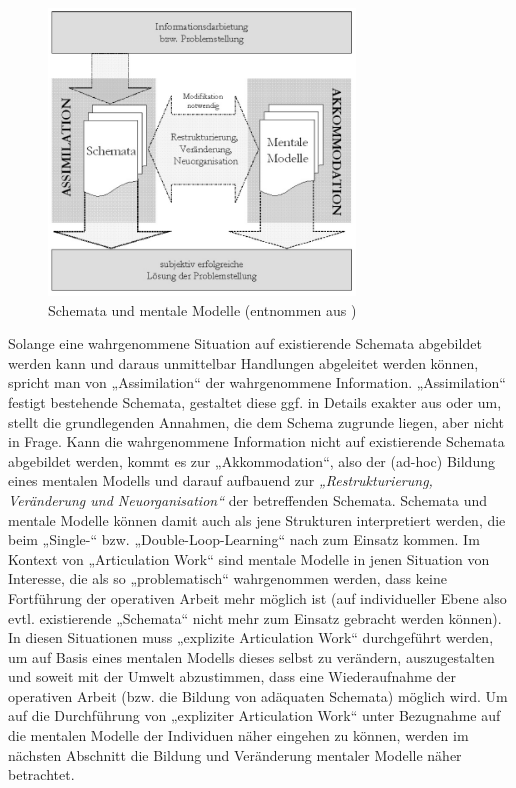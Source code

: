 \begin{figure}[htbp]
	\centering		\includegraphics[height=3in]{img/MentaleModelle/iffenthaler_assimilation_akkommodation.png}
	\caption[Schemata und mentale Modelle]{Schemata und mentale Modelle (entnommen aus \citet[][S. 10]{Ifenthaler06})}
	\label{fig:img_MentaleModelle_iffenthaler_assimilation_akkommodation}
\end{figure}

Solange eine wahrgenommene Situation auf existierende Schemata abgebildet werden kann und daraus unmittelbar Handlungen abgeleitet werden können, spricht man von „Assimilation“ der wahrgenommene Information. „Assimilation“ festigt bestehende Schemata, gestaltet diese ggf. in Details exakter aus oder um, stellt die grundlegenden Annahmen, die dem Schema zugrunde liegen, aber nicht in Frage. Kann die wahrgenommene Information nicht auf existierende Schemata abgebildet werden, kommt es zur „Akkommodation“, also der (ad-hoc) Bildung eines mentalen Modells und darauf aufbauend zur \emph{„Restrukturierung, Veränderung und Neuorganisation“} \citep{Ifenthaler06} der betreffenden Schemata. Schemata und mentale Modelle können damit auch als jene Strukturen interpretiert werden, die beim „Single-“ bzw. „Double-Loop-Learning“ nach \citet{Argyris78} zum Einsatz kommen. Im Kontext von „Articulation Work“ sind mentale Modelle in jenen Situation von Interesse, die als so „problematisch“ wahrgenommen werden, dass keine Fortführung der operativen Arbeit mehr möglich ist (auf individueller Ebene also evtl. existierende „Schemata“ nicht mehr zum Einsatz gebracht werden können). In diesen Situationen muss „explizite Articulation Work“ durchgeführt werden, um auf Basis eines mentalen Modells dieses selbst zu verändern, auszugestalten und soweit mit der Umwelt abzustimmen, dass eine Wiederaufnahme der operativen Arbeit (bzw. die Bildung von adäquaten Schemata) möglich wird. Um auf die Durchführung von „expliziter Articulation Work“ unter Bezugnahme auf die mentalen Modelle der Individuen näher eingehen zu können, werden im nächsten Abschnitt die Bildung und Veränderung mentaler Modelle näher betrachtet.

